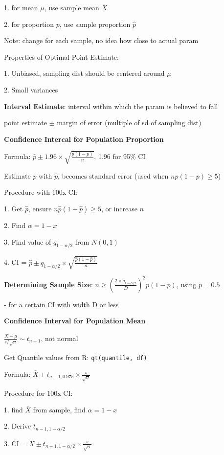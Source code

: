 \documentclass[10pt, a4paper]{article}
\newcommand{\tab}[0]{\hspace*{2mm}}
\begin{document}
\begin{multicols*}{3}
		1. for mean $\mu$, use sample mean $\overline{X}$

		2. for proportion $p$, use sample proportion $\hat{p}$

		Note: change for each sample, no idea how close to actual param

		Properties of Optimal Point Estimate:

		1. Unbiased, sampling dist should be centered around $\mu$

		2. Small variances

		\textbf{Interval Estimate}: interval within which the param is believed to fall

		point estimate $\pm$ margin of error (multiple of sd of sampling dist)

		\textbf{Confidence Intercal for Population Proportion}

		Formula: $\hat{p} \pm 1.96 \times \sqrt{\frac{p(1-p)}{n}}$, 1.96 for 95\% CI

		Estimate $p$ with $\hat{p}$, becomes standard error (used when $np(1-p) \geq 5$)

		Procedure with 100x CI:

		1. Get $\hat{p}$, ensure $n\hat{p}(1-\hat{p}) \geq 5$, or increase $n$

		2. Find $\alpha = 1 - x$

		3. Find value of $q_{1 - \alpha / 2}$ from $N(0, 1)$

		4. CI  = $\hat{p} \pm q_{1-\alpha / 2} \times \sqrt{\frac{\hat{p}(1-\hat{p})}{n}}$

		\textbf{Determining Sample Size}: $n \geq (\frac{2 \times q_{1 - \alpha / 2}}{D})^2 p(1-p)$, using $p=0.5$

		\tab{} - for a certain CI with width D or less

		\textbf{Confidence Interval for Population Mean}

		\centerline{$\frac{\overline{X} - \mu}{s / \sqrt{n}} \sim t_{n - 1}$, not normal}

		Get Quantile values from R: \texttt{qt(quantile, df)}

		Formula: $\overline{X} \pm t_{n-1, 0.975} \times \frac{s}{\sqrt{n}}$

		Procedure for 100x CI:

		1. find $\overline{X}$ from sample, find $\alpha = 1-x$
		
		2. Derive $t_{n - 1, 1- \alpha / 2}$

		3. CI = $\overline{X} \pm t_{n - 1, 1 - \alpha / 2} \times \frac{s}{\sqrt{n}}$


\end{multicols*}
\end{document}
